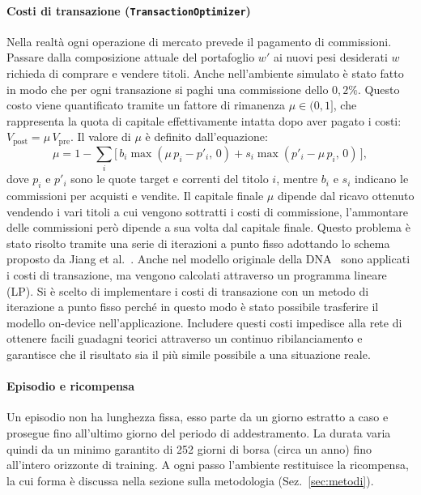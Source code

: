 \paragraph{Costi di transazione (\lstinline{TransactionOptimizer})}
Nella realtà ogni operazione di mercato prevede il pagamento di commissioni.
Passare dalla composizione attuale del portafoglio $w'$ ai nuovi pesi desiderati $w$ richieda di comprare e vendere titoli.
Anche nell'ambiente simulato è stato fatto in modo che per ogni transazione si paghi una commissione dello $0{,}2\%$.
Questo costo viene quantificato tramite un fattore di rimanenza $\mu \in (0,1]$, che rappresenta la quota di capitale effettivamente intatta dopo aver pagato i costi: $V_{\text{post}} = \mu\, V_{\text{pre}}$. 
Il valore di $\mu$ è definito dall'equazione:\begin{equation}\mu = 1 - \sum_i \Big[\, b_i \max(\mu\,p_i - p'_i,\,0) + s_i \max(p'_i - \mu\,p_i,\,0)\,\Big],\end{equation}
dove $p_i$ e $p'_i$ sono le quote target e correnti del titolo $i$, mentre $b_i$ e $s_i$ indicano le commissioni per acquisti e vendite.
Il capitale finale $\mu$ dipende dal ricavo ottenuto vendendo i vari titoli a cui vengono sottratti i costi di commissione, l'ammontare delle commissioni però dipende a sua volta dal capitale finale.
Questo problema è stato risolto tramite una serie di iterazioni a punto fisso adottando lo schema proposto da Jiang et al.~\cite{jiang2017deep}. Anche nel modello originale della DNA~\cite{betancourt2021deep} sono applicati i costi di transazione, ma vengono calcolati attraverso un programma lineare (LP). 
Si è scelto di implementare i costi di transazione con un metodo di iterazione a punto fisso perché in questo modo è stato possibile trasferire il modello on-device nell'applicazione.
Includere questi costi impedisce alla rete di ottenere facili guadagni teorici attraverso un continuo ribilanciamento e garantisce che il risultato sia il più simile possibile a una situazione reale.

\paragraph{Episodio e ricompensa}
Un episodio non ha lunghezza fissa, esso parte
da un giorno estratto a caso e prosegue fino all'ultimo giorno del periodo di
addestramento. La durata varia quindi da un minimo
garantito di 252 giorni di borsa (circa un anno) fino all'intero orizzonte di training. 
A ogni passo l'ambiente restituisce la ricompensa, la cui
forma è discussa nella sezione sulla metodologia (Sez.~\ref{sec:metodi}).


